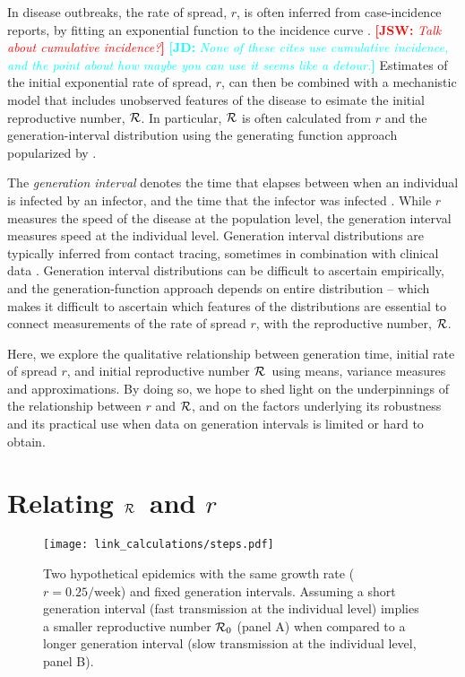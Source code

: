\documentclass[12pt]{article}
\newcommand{\RR}{\ensuremath{{\cal R}}}
\newcommand{\Rx}[1]{\ensuremath{{\cal R}_{#1}}}
\newcommand{\Ro}{\Rx{0}}
\newcommand{\comment}[3]{\textcolor{#1}{\textbf{[#2: }\textit{#3}\textbf{]}}}
\newcommand{\jd}[1]{\comment{cyan}{JD}{#1}}
\newcommand{\jsw}[1]{\comment{red}{JSW}{#1}}
\begin{document}
In disease outbreaks, the rate of spread, $r$, is often inferred from case-incidence reports, by fitting an exponential function to the incidence curve \cite{MillRobi04, NishCast09, MaJDush14}.
\jsw{Talk about cumulative incidence?}
\jd{None of these cites use cumulative incidence, and the point about how maybe you can use it seems like a detour.}
Estimates of the initial exponential rate of spread, $r$, can then be combined with a mechanistic model that includes unobserved features of the disease to esimate the initial reproductive number, \RR.
In particular, $\RR$ is often calculated from $r$ and the generation-interval distribution using the generating function approach popularized by \cite{WallLips07}.

The \emph{generation interval} denotes the time that elapses between when an individual is infected by an infector, and the time that the infector was infected \cite{Sven07}.
While $r$ measures the speed of the disease at the population level, the generation interval measures speed at the individual level.
Generation interval distributions are typically inferred from contact tracing, sometimes in combination with clinical data \cite{AylwBarb14,LessOtt16,HubeJohn16}.
Generation interval distributions can be difficult to ascertain empirically, and the generation-function approach depends on entire distribution -- which makes it difficult to ascertain which features of the distributions are essential to connect measurements of the rate of spread $r$, with the reproductive number, \RR.

Here, we explore the qualitative relationship between generation time, initial rate of spread $r$, and initial reproductive number \RR\ using means, variance measures and approximations.
By doing so, we hope to shed light on the underpinnings of the relationship between $r$ and \RR, and on the factors underlying its robustness and its practical use when data on generation intervals is limited or hard to obtain.

\section{Relating \RR\ and $r$}

\begin{figure}[htbp] \centering
	\texttt{[image: link\_calculations/steps.pdf]}
	\caption{Two hypothetical epidemics with the same growth rate ($r=0.25/\mathrm{week}$) and fixed generation intervals.  Assuming a short generation interval (fast transmission at the individual level) implies a smaller reproductive number $\Ro$ (panel A) when compared to a longer generation interval (slow transmission at the individual level, panel B). 
	\label{fig:link}}
\end{figure}
\end{document}
